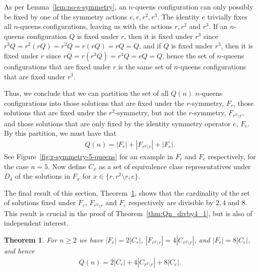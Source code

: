 \documentclass[pdflatex,sn-mathphys-num]{sn-jnl}
\theoremstyle{thmstyleone}
\newtheorem{theorem}{Theorem}
\theoremstyle{thmstyletwo}
\theoremstyle{thmstylethree}
\begin{document}
As per Lemma~\ref{lem:no-s-symmetry}, an $n$-queens configuration can only possibly be fixed by one of the symmetry 
actions $e, r, r^2, r^3$. The identity $e$ trivially fixes all $n$-queens configurations, leaving us with the actions 
$r, r^2$ and $r^3$. If an $n$-queens configuration $Q$ is fixed under $r$, then it is fixed under $r^3$ since 
$r^3Q = r^2(rQ) = r^2Q = r(rQ) = rQ = Q$, and if $Q$ is fixed under $r^3$, then it is fixed under $r$ since 
$rQ = r(r^3Q) = r^4Q = eQ = Q$, hence the set of $n$-queens configurations that are fixed under $r$ is the same 
set of $n$-queens configurations that are fixed under $r^3$. 

Thus, we conclude that we can partition 
the set of all $Q(n)$ $n$-queens configurations into those solutions that are fixed under the $r$-symmetry, $F_r$, 
those solutions that are fixed under the $r^2$-symmetry, but not the $r$-symmetry, $F_{r^2 \setminus r}$, and 
those solutions that are only fixed by the identity symmetry operator $e$, $F_e$. By this partition, we must have that 
\begin{align} \label{eq:Qn_decomposition_Fx}
    Q(n) = |F_r| + |F_{r^2 \setminus r}| + |F_e|.
\end{align}
See Figure~\ref{fig:r-symmetry-5-queens} 
for an example in $F_r$ and $F_e$ respectively, for the case $n = 5$. Now define $C_x$ as a set of equivalence class representatives under $D_4$ 
of the solutions in $F_x$ for $x \in \lbrace r, r^2 \setminus r, e \rbrace$. 

The final result of this section, Theorem~\ref{thm:Qn_decomposition}, shows that the cardinality of the set of solutions fixed under $F_r$, $F_{r^2 \setminus r}$ and 
$F_e$ respectively are divisible by $2, 4$ and $8$. This result is crucial in the proof of Theorem~\ref{thm:Qn_divby4_1}, but is also of independent 
interest.

\begin{theorem}\label{thm:Qn_decomposition}
For $n \geq 2$ we have $|F_r| = 2|C_r|$, $|F_{r^2 \setminus r}| = 4|C_{r^2 \setminus r}|$, and $|F_e| = 8|C_e|$, and hence
\begin{align}
    Q(n) = 2|C_r| + 4|C_{r^2 \setminus r}| + 8|C_e|.
\end{align}
\end{theorem}
\end{document}

